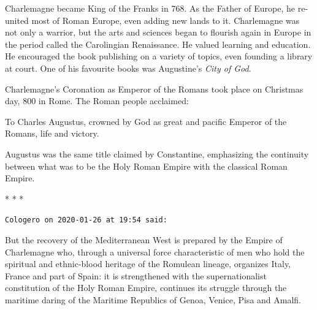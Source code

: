 Charlemagne became King of the Franks in 768. As the Father of Europe, he re-united most of Roman Europe, even adding new lands to it. Charlemagne was not only a warrior, but the arts and sciences began to flourish again in Europe in the period called the Carolingian Renaissance. He valued learning and education. He encouraged the book publishing on a variety of topics, even founding a library at court. One of his favourite books was Augustine’s \emph{City of God}.

Charlemagne’s Coronation as Emperor of the Romans took place on Christmas day, 800 in Rome. The Roman people acclaimed:

\begin{quotex}
To Charles Augustus, crowned by God as great and pacific Emperor of the Romans, life and victory. 

\end{quotex}

Augustus was the same title claimed by Constantine, emphasizing the continuity between what was to be the Holy Roman Empire with the classical Roman Empire.


\begin{center}* * *\end{center}

\begin{footnotesize}\begin{sffamily}

\texttt{Cologero on 2020-01-26 at 19:54 said: }

But the recovery of the Mediterranean West is prepared by the Empire of Charlemagne who, through a universal force characteristic of men who hold the spiritual and ethnic-blood heritage of the Romulean lineage, organizes Italy, France and part of Spain: it is strengthened with the supernationalist constitution of the Holy Roman Empire, continues its struggle through the maritime daring of the Maritime Republics of Genoa, Venice, Pisa and Amalfi. 

\hfill
\end{sffamily}\end{footnotesize}